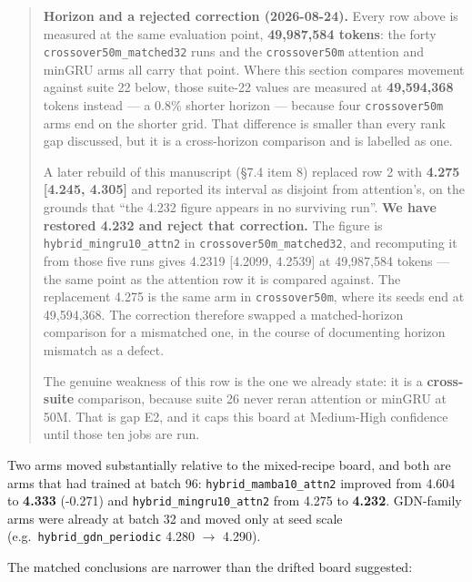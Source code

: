 \begin{quote}
\textbf{Horizon and a rejected correction (2026-08-24).} Every row above is measured at the same
evaluation point, \textbf{49,987,584 tokens}: the forty \texttt{crossover50m\_matched32} runs and the
\texttt{crossover50m} attention and minGRU arms all carry that point. Where this section compares
movement against suite 22 below, those suite-22 values are measured at \textbf{49,594,368} tokens
instead --- a 0.8\% shorter horizon --- because four \texttt{crossover50m} arms end on the shorter grid.
That difference is smaller than every rank gap discussed, but it is a cross-horizon comparison
and is labelled as one.

A later rebuild of this manuscript (\S7.4 item 8) replaced row 2 with \textbf{4.275 {[}4.245, 4.305{]}}
and reported its interval as disjoint from attention's, on the grounds that ``the 4.232 figure
appears in no surviving run''. \textbf{We have restored 4.232 and reject that correction.} The figure
is \texttt{hybrid\_mingru10\_attn2} in \texttt{crossover50m\_matched32}, and recomputing it from those five runs
gives 4.2319 {[}4.2099, 4.2539{]} at 49,987,584 tokens --- the same point as the attention row it is
compared against. The replacement 4.275 is the same arm in \texttt{crossover50m}, where its seeds end
at 49,594,368. The correction therefore swapped a matched-horizon comparison for a mismatched
one, in the course of documenting horizon mismatch as a defect.

The genuine weakness of this row is the one we already state: it is a \textbf{cross-suite} comparison,
because suite 26 never reran attention or minGRU at 50M. That is gap E2, and it caps this board
at Medium-High confidence until those ten jobs are run.
\end{quote}

Two arms moved substantially relative to the mixed-recipe board, and both are arms that had
trained at batch 96: \texttt{hybrid\_mamba10\_attn2} improved from 4.604 to \textbf{4.333} (-0.271) and
\texttt{hybrid\_mingru10\_attn2} from 4.275 to \textbf{4.232}. GDN-family arms were already at batch 32 and moved
only at seed scale (e.g.~\texttt{hybrid\_gdn\_periodic} 4.280 $\rightarrow$ 4.290).

The matched conclusions are narrower than the drifted board suggested:

